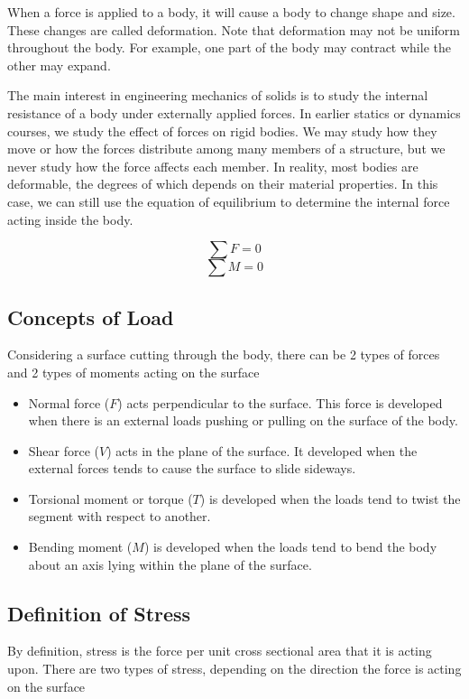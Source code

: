 \documentclass[a4paper,openany,12pt]{book}
\begin{document}
When a force is applied to a body, it will cause a body to change shape
and size. These changes are called deformation. Note that deformation
may not be uniform throughout the body. For example, one part of the
body may contract while the other may expand.

The main interest in engineering mechanics of solids is to study the
internal resistance of a body under externally applied forces. In
earlier statics or dynamics courses, we study the effect of forces on
rigid bodies. We may study how they move or how the forces distribute
among many members of a structure, but we never study how the force
affects each member. In reality, most bodies are deformable, the degrees
of which depends on their material properties. In this case, we can
still use the equation of equilibrium to determine the internal force
acting inside the body.

$$\sum F = 0$$ $$\sum M = 0$$

\subsection{Concepts of Load}
\label{sec:org5ee7735}
Considering a surface cutting through the body, there can be 2 types of
forces and 2 types of moments acting on the surface

\begin{itemize}
\item Normal force (\(F\)) acts perpendicular to the surface. This force is
developed when there is an external loads pushing or pulling on the
surface of the body.

\item Shear force (\(V\)) acts in the plane of the surface. It developed when
the external forces tends to cause the surface to slide sideways.

\item Torsional moment or torque (\(T\)) is developed when the loads tend to
twist the segment with respect to another.

\item Bending moment (\(M\)) is developed when the loads tend to bend the body
about an axis lying within the plane of the surface.
\end{itemize}

\subsection{Definition of Stress}
\label{sec:orgfd5f632}
By definition, stress is the force per unit cross sectional area that it
is acting upon. There are two types of stress, depending on the
direction the force is acting on the surface
\end{document}
